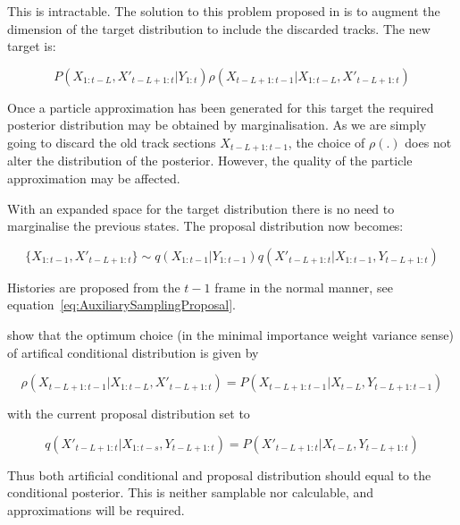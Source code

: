This is intractable. The solution to this problem proposed in \cite{Doucet2006} is to augment the dimension of the target distribution to include the discarded tracks. The new target is:

\begin{equation}
P(X_{1:t-L}, X'_{t-L+1:t}|Y_{1:t}) \rho(X_{t-L+1:t-1}|X_{1:t-L}, X'_{t-L+1:t})
\label{eq:FLTarget}
\end{equation}

Once a particle approximation has been generated for this target the required posterior distribution may be obtained by marginalisation. As we are simply going to discard the old track sections $X_{t-L+1:t-1}$, the choice of $\rho(.)$ does not alter the distribution of the posterior. However, the quality of the particle approximation may be affected.

With an expanded space for the target distribution there is no need to marginalise the previous states. The proposal distribution now becomes:

\begin{equation}
\{X_{1:t-1}, X'_{t-L+1:t}\} \sim q(X_{1:t-1}|Y_{1:t-1}) q(X'_{t-L+1:t}|X_{1:t-1}, Y_{t-L+1:t})
\label{eq:ExtendedFLProposal}
\end{equation}

Histories are proposed from the $t-1$ frame in the normal manner, see equation~\ref{eq:AuxiliarySamplingProposal}.

\cite{Doucet2006} show that the optimum choice (in the minimal importance weight variance sense) of artifical conditional distribution is given by 

\begin{equation}
\rho(X_{t-L+1:t-1}|X_{1:t-L}, X'_{t-L+1:t}) = P(X_{t-L+1:t-1}|X_{t-L}, Y_{t-L+1:t-1})
\label{eq:}
\end{equation}

with the current proposal distribution set to

\begin{equation}
q(X'_{t-L+1:t}|X_{1:t-s}, Y_{t-L+1:t}) = P(X'_{t-L+1:t}|X_{t-L}, Y_{t-L+1:t})
\label{eq:}
\end{equation}

Thus both artificial conditional and proposal distribution should equal to the conditional posterior. This is neither samplable nor calculable, and approximations will be required.


